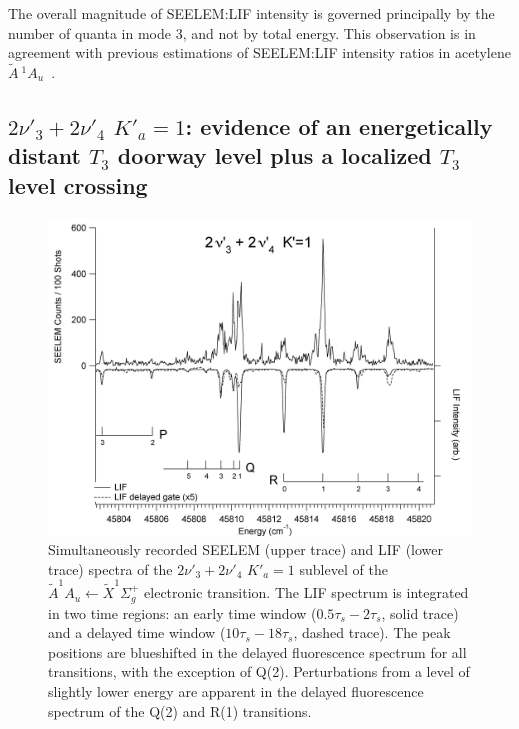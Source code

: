 \documentclass[12pt]{mitthesis}
\newcommand{\astate}{$
  \tilde{A} \: ^1\!A_u
  $}
\begin{document}
The overall magnitude of SEELEM:LIF intensity is governed principally
by the number of quanta in mode 3, and not by total energy.  This
observation is in agreement with previous estimations of SEELEM:LIF
intensity ratios in acetylene \astate\ \cite{humphrey97}.

\subsection{$2\nu'_3+2\nu'_4$ $K'_a\!=\!1$: evidence of an
  energetically distant $T_3$ doorway level plus a localized $T_3$
  level crossing}




\begin{figure}
  \caption{Simultaneously recorded SEELEM (upper trace) and LIF (lower
    trace) spectra of the $2\nu'_3+2\nu'_4$ $K'_a\!=\!1$ sublevel of
    the $\tilde{A}^1A_u \leftarrow \tilde{X} ^1\Sigma_g^+$ electronic
    transition.  The LIF spectrum is integrated in two time regions:
    an early time window ($0.5\tau_s-2\tau_s$, solid trace) and a
    delayed time window ($10\tau_s-18\tau_s$, dashed trace).  The peak
    positions are blueshifted in the delayed fluorescence spectrum for
    all transitions, with the exception of Q(2).  Perturbations from a
    level of slightly lower energy are apparent in the delayed
    fluorescence spectrum of the Q(2) and R(1) transitions.}
  \label{fig:spectrum-32b2}
  \centering
  \includegraphics[width=7in,angle=90]{acetylene-32b2-p3r4.png}
\end{figure}
\end{document}
